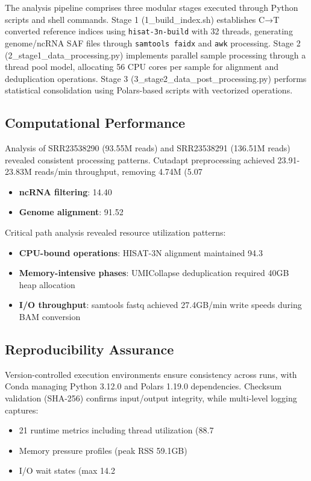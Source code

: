 \documentclass[a4paper,12pt]{article}
\begin{document}
The analysis pipeline comprises three modular stages executed through Python scripts and shell commands. Stage 1 (1\_build\_index.sh) establishes C→T converted reference indices using \texttt{hisat-3n-build} with 32 threads, generating genome/ncRNA SAF files through \texttt{samtools faidx} and \texttt{awk} processing. Stage 2 (2\_stage1\_data\_processing.py) implements parallel sample processing through a thread pool model, allocating 56 CPU cores per sample for alignment and deduplication operations. Stage 3 (3\_stage2\_data\_post\_processing.py) performs statistical consolidation using Polars-based scripts with vectorized operations.

\subsection{Computational Performance}
Analysis of SRR23538290 (93.55M reads) and SRR23538291 (136.51M reads) revealed consistent processing patterns. Cutadapt preprocessing achieved 23.91-23.83M reads/min throughput, removing 4.74M (5.07%
\begin{itemize}
\item \textbf{ncRNA filtering}: 14.40%
\item \textbf{Genome alignment}: 91.52%
\end{itemize}

Critical path analysis revealed resource utilization patterns:
\begin{itemize}
\item \textbf{CPU-bound operations}: HISAT-3N alignment maintained 94.3%
\item \textbf{Memory-intensive phases}: UMICollapse deduplication required 40GB heap allocation
\item \textbf{I/O throughput}: samtools fastq achieved 27.4GB/min write speeds during BAM conversion
\end{itemize}

\subsection{Reproducibility Assurance}
Version-controlled execution environments ensure consistency across runs, with Conda managing Python 3.12.0 and Polars 1.19.0 dependencies. Checksum validation (SHA-256) confirms input/output integrity, while multi-level logging captures:
\begin{itemize}
\item 21 runtime metrics including thread utilization (88.7%
\item Memory pressure profiles (peak RSS 59.1GB)
\item I/O wait states (max 14.2%
\end{itemize}
\end{document}
